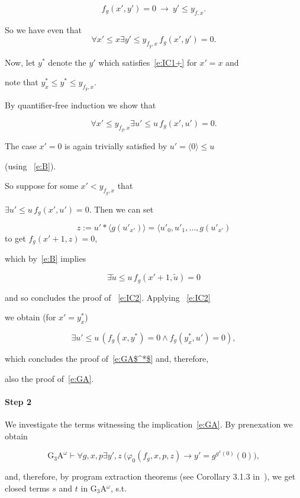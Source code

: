 \documentclass[1p]{elsarticle}
\newcommand{\be}[1][{e:\arabic{equation}}] { \begin{equation}\label{#1} }
\newcommand{\ee} { \end{equation} }
\theoremstyle{plain}
\theoremstyle{definition}
\theoremstyle{remark}
\renewenvironment{proof}[1][]{\noindent{\bf Proof{#1}. }}{\nopagebreak[4]{\hspace*{\fill}


  $\Box$              %

 }{\vspace{2ex}}}
\renewcommand{\phi}{\varphi}
\theoremstyle{definition}
\begin{document}
{\begin{proof}
\[ f_g(x',y')=0\ \rightarrow\ y'\leq y_{f,x}.\] 

So we have even that \\

\be[e:IC1+]

\forall x'\leq x \exists y'\leq y_{f_g,x}\, f_g(x',y')=0.

\ee

Now, let $y^*$ denote the $y'$ which satisfies~\eqref{e:IC1+} for $x'=x$ and 

note that $y^*_x\le y^*\le y_{f_g,x}.$ 

By quantifier-free induction we show that 

\be[e:IC2]\forall x'\leq y_{f_g,x} \exists u'\leq u \, f_g(x',u')=0.\ee

The case $x'=0$ is again trivially satisfied by $u'=\langle 0 \rangle \le u$ 

(using ~\eqref{e:B}). 

So suppose for some $x'< y_{f_g,x}$ that

$\exists u'\leq u \,f_g(x',u')=0$. Then we can set

\[z:=u'*\langle g(u'_{x'})\rangle= \langle u'_0,u'_1,\ldots,g(u'_{x'})\] to get $f_g(x'+1,z)=0$,

which by~\eqref{e:B} implies 

\[\exists \tilde u\leq u \,f_g(x'+1, \tilde u)=0\]

and so concludes the proof of ~\eqref{e:IC2}. Applying ~\eqref{e:IC2} 

we obtain (for $x'=y^*_x$)

\[

\exists u'\leq u\, (f_g(x,y^*)=0\wedge f_g(y^*_x,u')=0),

\]

which concludes the proof of~\eqref{e:GA$^*$} and, therefore, 

also the proof of~\eqref{e:GA}.\\

\paragraph{Step 2} We investigate the terms witnessing the implication~\eqref{e:GA}. By prenexation we obtain

\[

\mbox{G$_3$A}^\omega\vdash \forall g,x,p\exists y',z\ \big(\phi_0(f_g,x,p,z)\rightarrow y'=g^{g^{x}(0)}(0)\big),

\]

and, therefore, by program extraction theorems (see Corollary 3.1.3 in~\cite{Kohlenbach(lowrate)}), we get closed terms $s$ and $t$ in G$_3$A$^\omega$, s.t.


\end{proof}}
\end{document}
